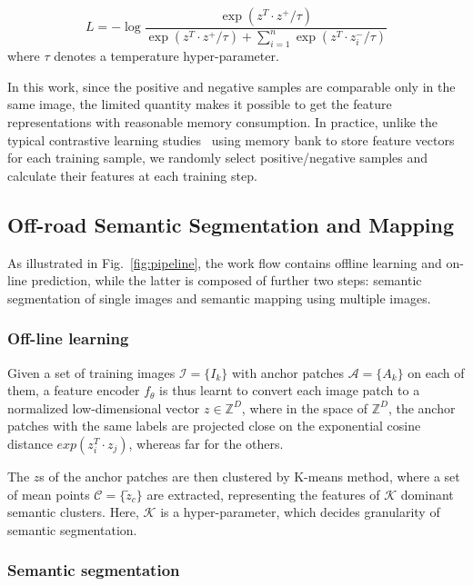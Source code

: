 \documentclass[letterpaper, 10 pt, conference]{ieeeconf}  %
\begin{document}
\vspace{-2mm}
\begin{equation}\label{loss}
L=-\log {\dfrac{\exp (z^T \cdot z^+/\tau)}{\exp (z^T \cdot z^+/\tau)+\sum_{i=1}^{n}{\exp (z^T \cdot z_i^-/\tau)}}}
\end{equation}
where $\tau$ denotes a temperature hyper-parameter.

In this work, since the positive and negative samples are comparable only in the same image, the limited quantity makes it possible to get the feature representations with reasonable memory consumption. In practice, unlike the typical contrastive learning studies~\cite{Wu_2018_CVPR} using memory bank to store feature vectors for each training sample, we randomly select positive/negative samples and calculate their features at each training step.

\subsection{Off-road Semantic Segmentation and Mapping}

As illustrated in Fig.~\ref{fig:pipeline}, the work flow contains offline learning and on-line prediction, while the latter is composed of further two steps: semantic segmentation of single images and semantic mapping using multiple images.

\subsubsection{Off-line learning}
Given a set of training images $\mathcal{I}=\{I_k\}$ with anchor patches $\mathcal{A}=\{A_k\}$ on each of them, a feature encoder $f_\theta$ is thus learnt to convert each image patch to a normalized low-dimensional vector $z\in \mathbb{Z}^D$, where in the space of $\mathbb{Z}^D$, the anchor patches with the same labels are projected close on the exponential cosine distance $exp(z_i^T \cdot z_j)$, whereas far for the others.

The $z$s of the anchor patches are then clustered by K-means method, where a set of mean points $\mathcal{C}=\{\tilde{z}_c\}$ are extracted, representing the features of $\mathcal{K}$ dominant semantic clusters. Here, $\mathcal{K}$ is a hyper-parameter, which decides granularity of semantic segmentation.

\subsubsection{Semantic segmentation}
\end{document}
